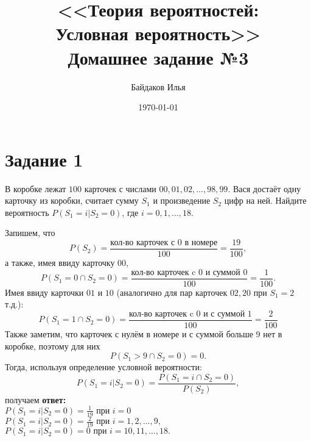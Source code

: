 \documentclass[a4paper,12pt]{article}
\newcommand{\ssolve}{\par\vspace{5pt}\noindent{\bf Решение. }\par}
\begin{document}
\title{<<Теория вероятностей:\\ Условная вероятность>>\\ \vspace{12pt} Домашнее задание №3}
\author{Байдаков Илья}
\date{\today}
\maketitle

\section*{Задание 1}
В коробке лежат $100$ карточек с числами $00, 01, 02, \ldots, 98, 99$. Вася достаёт одну карточку из коробки, считает сумму $S_1$ и произведение $S_2$ цифр на ней. Найдите вероятность $P(S_1 = i|S_2 = 0)$, где $i = 0, 1, \ldots , 18$.
\ssolve
Запишем, что $$P(S_2) = \frac{\text{кол-во карточек с 0 в номере}}{100} = \frac{19}{100},$$
а также, имея ввиду карточку $00$,
$$P(S_1=0 \cap S_2 = 0) = \frac{\text{кол-во карточек c 0 и суммой 0}}{100} = \frac{1}{100}.$$
Имея ввиду карточки $01$ и $10$ (аналогично для пар карточек $02, 20$ при $S_1=2$ т.д.):
$$P(S_1=1 \cap S_2 = 0) = \frac{\text{кол-во карточек c 0 и с суммой 1}}{100} = \frac{2}{100}$$
Также заметим, что карточек с нулём в номере и с суммой больше 9 нет в коробке, поэтому для них
$$P(S_1>9 \cap S_2=0) = 0.$$
Тогда, используя определение условной вероятности:
$$P(S_1=i | S_2 = 0) = \frac{P(S_1=i \cap S_2 = 0)}{P(S_2)},$$
получаем \textbf{ответ:} \\
$P(S_1=i | S_2 = 0) = \frac{1}{19} \text{ при } i = 0 $ \\
$P(S_1=i | S_2 = 0) = \frac{2}{19} \text{ при } i = 1, 2, \ldots, 9,$ \\
$P(S_1=i | S_2 = 0) = 0 \text{ при } i = 10, 11, \ldots, 18.$
 
\end{document}
